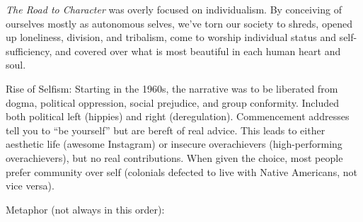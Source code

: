 \documentclass[
]{article}
\begin{document}
\emph{The Road to Character} was overly focused on individualism. By
conceiving of ourselves mostly as autonomous selves, we've torn our
society to shreds, opened up loneliness, division, and tribalism, come
to worship individual status and self-sufficiency, and covered over what
is most beautiful in each human heart and soul.

Rise of Selfism: Starting in the 1960s, the narrative was to be
liberated from dogma, political oppression, social prejudice, and group
conformity. Included both political left (hippies) and right
(deregulation). Commencement addresses tell you to ``be yourself'' but
are bereft of real advice. This leads to either aesthetic life (awesome
Instagram) or insecure overachievers (high-performing overachievers),
but no real contributions. When given the choice, most people prefer
community over self (colonials defected to live with Native Americans,
not vice versa).

Metaphor (not always in this order):
\end{document}
